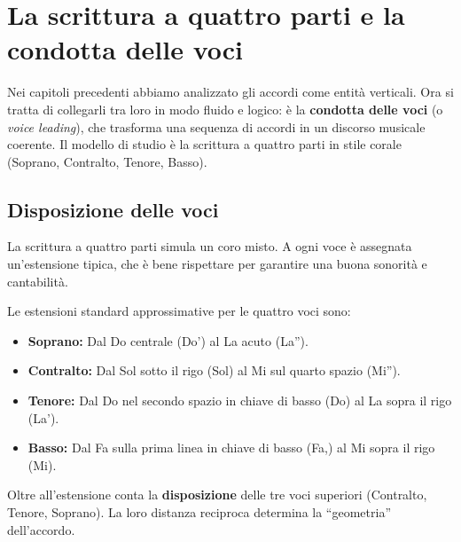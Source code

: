 \chapter{La scrittura a quattro parti e la condotta delle voci}
\label{chap:condotta_voci}

Nei capitoli precedenti abbiamo analizzato gli accordi come entità verticali. Ora si tratta di collegarli tra loro in modo fluido e logico: è la \textbf{condotta delle voci} (o \textit{voice leading}), che trasforma una sequenza di accordi in un discorso musicale coerente. Il modello di studio è la scrittura a quattro parti in stile corale (Soprano, Contralto, Tenore, Basso).

\section{Disposizione delle voci}
\label{sec:disposizione_voci}

La scrittura a quattro parti simula un coro misto. A ogni voce è assegnata un'estensione tipica, che è bene rispettare per garantire una buona sonorità e cantabilità.

\begin{definizione}
	\label{def:estensione_voci}
	Le estensioni standard approssimative per le quattro voci sono:
	\begin{itemize}
		\item \textbf{Soprano:} Dal Do centrale (Do') al La acuto (La'').
		\item \textbf{Contralto:} Dal Sol sotto il rigo (Sol) al Mi sul quarto spazio (Mi'').
		\item \textbf{Tenore:} Dal Do nel secondo spazio in chiave di basso (Do) al La sopra il rigo (La').
		\item \textbf{Basso:} Dal Fa sulla prima linea in chiave di basso (Fa,) al Mi sopra il rigo (Mi).
	\end{itemize}
\end{definizione}

Oltre all'estensione conta la \textbf{disposizione} delle tre voci superiori (Contralto, Tenore, Soprano). La loro distanza reciproca determina la ``geometria'' dell'accordo.

